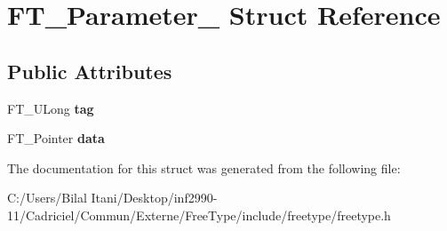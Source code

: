 \hypertarget{struct_f_t___parameter__}{}\section{F\+T\+\_\+\+Parameter\+\_\+ Struct Reference}
\label{struct_f_t___parameter__}
\subsection*{Public Attributes}
\begin{DoxyCompactItemize}
\item 
F\+T\+\_\+\+U\+Long {\bfseries tag}\hypertarget{struct_f_t___parameter___a5a53ef2652683a2cd9ee6a0a694cb76b}{}\label{struct_f_t___parameter___a5a53ef2652683a2cd9ee6a0a694cb76b}

\item 
F\+T\+\_\+\+Pointer {\bfseries data}\hypertarget{struct_f_t___parameter___a930c8885bd25be8d054443153c817c13}{}\label{struct_f_t___parameter___a930c8885bd25be8d054443153c817c13}

\end{DoxyCompactItemize}


The documentation for this struct was generated from the following file\+:\begin{DoxyCompactItemize}
\item 
C\+:/\+Users/\+Bilal Itani/\+Desktop/inf2990-\/11/\+Cadriciel/\+Commun/\+Externe/\+Free\+Type/include/freetype/freetype.\+h\end{DoxyCompactItemize}
